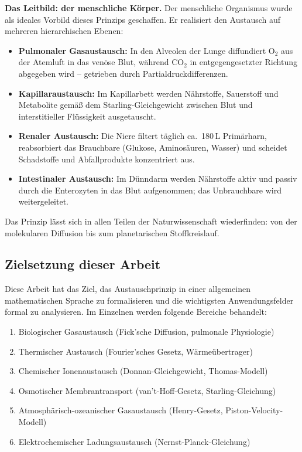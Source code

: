 ﻿\documentclass[a4paper,12pt]{article}
\theoremstyle{definition}
\begin{document}
\textbf{Das Leitbild: der menschliche Körper.}
Der menschliche Organismus wurde als ideales Vorbild dieses Prinzips geschaffen. Er realisiert
den Austausch auf mehreren hierarchischen Ebenen:
\begin{itemize}
    \item \textbf{Pulmonaler Gasaustausch:} In den Alveolen der Lunge diffundiert $\mathrm{O}_2$
          aus der Atemluft in das venöse Blut, während $\mathrm{CO}_2$ in entgegengesetzter
          Richtung abgegeben wird -- getrieben durch Partialdruckdifferenzen.
    \item \textbf{Kapillaraustausch:} Im Kapillarbett werden Nährstoffe, Sauerstoff und
          Metabolite gemäß dem Starling-Gleichgewicht zwischen Blut und interstitieller
          Flüssigkeit ausgetauscht.
    \item \textbf{Renaler Austausch:} Die Niere filtert täglich ca.\ 180\,L Primärharn,
          reabsorbiert das Brauchbare (Glukose, Aminosäuren, Wasser) und scheidet Schadstoffe
          und Abfallprodukte konzentriert aus.
    \item \textbf{Intestinaler Austausch:} Im Dünndarm werden Nährstoffe aktiv und passiv
          durch die Enterozyten in das Blut aufgenommen; das Unbrauchbare wird weitergeleitet.
\end{itemize}

Das Prinzip lässt sich in allen Teilen der Naturwissenschaft wiederfinden: von der
molekularen Diffusion bis zum planetarischen Stoffkreislauf.

\subsection{Zielsetzung dieser Arbeit}

Diese Arbeit hat das Ziel, das Austauschprinzip in einer allgemeinen mathematischen Sprache
zu formalisieren und die wichtigsten Anwendungsfelder formal zu analysieren.
Im Einzelnen werden folgende Bereiche behandelt:
\begin{enumerate}
    \item Biologischer Gasaustausch (Fick'sche Diffusion, pulmonale Physiologie)
    \item Thermischer Austausch (Fourier'sches Gesetz, Wärmeübertrager)
    \item Chemischer Ionenaustausch (Donnan-Gleichgewicht, Thomas-Modell)
    \item Osmotischer Membrantransport (van't-Hoff-Gesetz, Starling-Gleichung)
    \item Atmosphärisch-ozeanischer Gasaustausch (Henry-Gesetz, Piston-Velocity-Modell)
    \item Elektrochemischer Ladungsaustausch (Nernst-Planck-Gleichung)
\end{enumerate}
\end{document}
